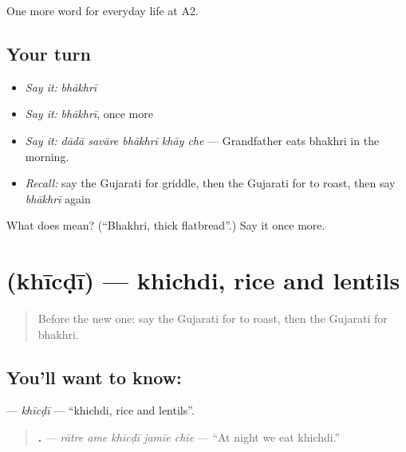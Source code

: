 \begin{grammarlens}[title={What you've built}]
One more word for everyday life at A2.
\end{grammarlens}

\subsection*{Your turn}
\begin{itemize}
\raggedright
  \item \emph{Say it:} \emph{bhākhrī}
  \item \emph{Say it:} \emph{bhākhrī}, once more
  \item \emph{Say it:} \emph{dādā savāre bhākhrī khāy che} — Grandfather eats bhakhri in the morning.
  \item \emph{Recall:} say the Gujarati for griddle, then the Gujarati for to roast, then say \emph{bhākhrī} again
\end{itemize}

\begin{tcolorbox}[breakable,colback=teal!4,colframe=teal!35!black,title={Before you move on}]
What does  mean? (\textquotedblleft{}Bhakhri, thick flatbread\textquotedblright{}.) Say it once more.
\end{tcolorbox}
\section[\texorpdfstring{\gu{ખીચડી} (khīcḍī)}{ખીચડી (khīcḍī)}]{ (khīcḍī) — khichdi, rice and lentils}

\label{lesson:GU-C169-khicdi}



\begin{quote}
Before the new one: say the Gujarati for to roast, then the Gujarati for bhakhri.
\end{quote}

\subsection*{You'll want to know: }
\textbf{} — \emph{khīcḍī} — \textquotedblleft{}khichdi, rice and lentils\textquotedblright{}.

\begin{quote}
\textbf{    .} — \emph{rātre ame khīcḍī jamīe chīe} — \textquotedblleft{}At night we eat khichdi.\textquotedblright{}
\end{quote}

